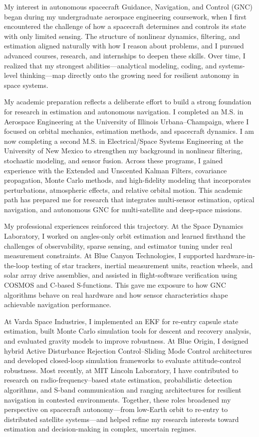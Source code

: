 \documentclass[11pt]{article}
\begin{document}
	
	My interest in autonomous spacecraft Guidance, Navigation, and Control (GNC) began during my undergraduate aerospace engineering coursework, when I first encountered the challenge of how a spacecraft determines and controls its state with only limited sensing. The structure of nonlinear dynamics, filtering, and estimation aligned naturally with how I reason about problems, and I pursued advanced courses, research, and internships to deepen these skills. Over time, I realized that my strongest abilities—analytical modeling, coding, and systems-level thinking—map directly onto the growing need for resilient autonomy in space systems.
	
	My academic preparation reflects a deliberate effort to build a strong foundation for research in estimation and autonomous navigation. I completed an M.S. in Aerospace Engineering at the University of Illinois Urbana–Champaign, where I focused on orbital mechanics, estimation methods, and spacecraft dynamics. I am now completing a second M.S. in Electrical/Space Systems Engineering at the University of New Mexico to strengthen my background in nonlinear filtering, stochastic modeling, and sensor fusion. Across these programs, I gained experience with the Extended and Unscented Kalman Filters, covariance propagation, Monte Carlo methods, and high-fidelity modeling that incorporates perturbations, atmospheric effects, and relative orbital motion. This academic path has prepared me for research that integrates multi-sensor estimation, optical navigation, and autonomous GNC for multi-satellite and deep-space missions.
	
	My professional experiences reinforced this trajectory. At the Space Dynamics Laboratory, I worked on angles-only orbit estimation and learned firsthand the challenges of observability, sparse sensing, and estimator tuning under real measurement constraints. At Blue Canyon Technologies, I supported hardware-in-the-loop testing of star trackers, inertial measurement units, reaction wheels, and solar array drive assemblies, and assisted in flight-software verification using COSMOS and C-based S-functions. This gave me exposure to how GNC algorithms behave on real hardware and how sensor characteristics shape achievable navigation performance.
	
	At Varda Space Industries, I implemented an EKF for re-entry capsule state estimation, built Monte Carlo simulation tools for descent and recovery analysis, and evaluated gravity models to improve robustness. At Blue Origin, I designed hybrid Active Disturbance Rejection Control–Sliding Mode Control architectures and developed closed-loop simulation frameworks to evaluate attitude-control robustness. Most recently, at MIT Lincoln Laboratory, I have contributed to research on radio-frequency–based state estimation, probabilistic detection algorithms, and S-band communication and ranging architectures for resilient navigation in contested environments. Together, these roles broadened my perspective on spacecraft autonomy—from low-Earth orbit to re-entry to distributed satellite systems—and helped refine my research interests toward estimation and decision-making in complex, uncertain regimes.
	
\end{document}
